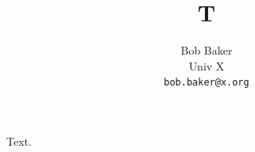 \documentclass{article}
\begin{document}
\title{T}
\author{Bob Baker\\ \small Univ X\\ \small \texttt{bob.baker@x.org}}
\maketitle
Text.
\end{document}
